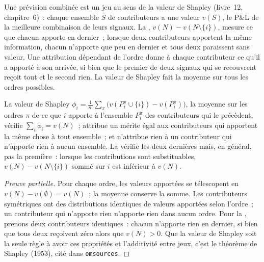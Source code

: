 Une prévision combinée est un jeu au sens de la valeur de Shapley (livre~12, chapitre~6)~: chaque ensemble $S$ de contributeurs a une valeur $v(S)$,
le P\&L de la meilleure combinaison de leurs signaux. La , $v(N)-v(N\setminus\{i\})$, mesure ce que chacun apporte en dernier~; lorsque deux
contributeurs apportent la même information, chacun n'apporte que peu en dernier et tous deux paraissent sans valeur. Une attribution dépendant de l'ordre donne à chaque
contributeur ce qu'il a apporté à son arrivée, si bien que le premier de deux signaux qui se recouvrent reçoit tout et le second rien. La valeur de Shapley fait la moyenne
sur tous les ordres possibles.

\begin{proposition}\label{prop:fm:managing-researchers-traders-and-engineers:shapley}
La valeur de Shapley
$\phi_i=\frac{1}{n!}\sum_{\pi}\bigl(v(P_i^\pi\cup\{i\})-v(P_i^\pi)\bigr)$, la moyenne sur les ordres $\pi$ de ce que $i$ apporte à l'ensemble $P_i^\pi$ des
contributeurs qui le précèdent, vérifie $\sum_i\phi_i=v(N)$~; attribue un mérite égal aux contributeurs qui apportent la même chose à tout ensemble~; et n'attribue rien à un
contributeur qui n'apporte rien à aucun ensemble. La  vérifie les deux dernières mais, en général, pas la première~: lorsque les contributions sont
substituables, $v(N)-v(N\setminus\{i\})$ sommé sur $i$ est inférieur à $v(N)$.
\end{proposition}

\begin{proof}[Preuve partielle]
Pour chaque ordre, les valeurs apportées se télescopent en $v(N)-v(\emptyset)=v(N)$~; la moyenne conserve la somme. Les contributeurs symétriques ont
des distributions identiques de valeurs apportées selon l'ordre~; un contributeur qui n'apporte rien n'apporte rien dans aucun ordre. Pour la , prenons deux
contributeurs identiques~: chacun n'apporte rien en dernier, si bien que tous deux reçoivent zéro alors que $v(N)>0$. Que la valeur de Shapley soit la seule règle à avoir ces propriétés et
l'additivité entre jeux, c'est le théorème de Shapley (1953), cité dans \texttt{omsources}.
\end{proof}

\label{lst:fm:managing-researchers-traders-and-engineers:shapley}

